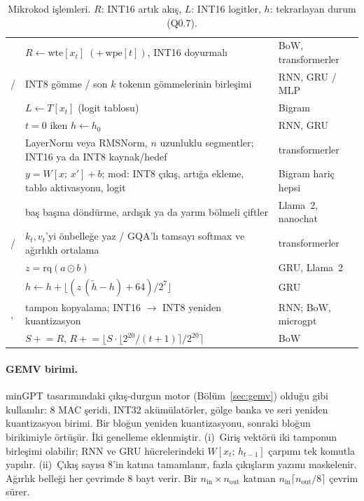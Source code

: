 \begin{table}[h]
  \centering\small
  \caption{Mikrokod işlemleri. $R$: INT16 artık akış, $L$: INT16 logitler, $h$: tekrarlayan durum (Q0.7).}
  \label{tab:isa}
  \setlength{\tabcolsep}{4pt}
  \begin{tabularx}{\textwidth}{@{}lLl@{}}
    \toprule
     &  &  \\ \midrule
     & $R \leftarrow \mathrm{wte}[x_t]\;(+\,\mathrm{wpe}[t])$, INT16 doyurmalı & BoW, transformerler \\
     /  & INT8 gömme / son $k$ tokenın gömmelerinin birleşimi & RNN, GRU / MLP \\
     & $L \leftarrow T[x_t]$ (logit tablosu) & Bigram \\
     & $t=0$ iken $h \leftarrow h_0$ & RNN, GRU \\
     & LayerNorm veya RMSNorm, $n$ uzunluklu segmentler; INT16 ya da INT8 kaynak/hedef & transformerler \\
     & $y = W[x;\,x'] + b$; mod: INT8 çıkış, artığa ekleme, tablo aktivasyonu, logit & Bigram hariç hepsi \\
     & baş başına döndürme, ardışık ya da yarım bölmeli çiftler & Llama~2, nanochat \\
     /  & $k_t, v_t$'yi önbelleğe yaz / GQA'lı tamsayı softmax ve ağırlıklı ortalama & transformerler \\
     & $z = \mathrm{rq}(a \odot b)$ & GRU, Llama~2 \\
     & $h \leftarrow h + \lfloor (z\,(\tilde h - h) + 64) / 2^7 \rfloor$ & GRU \\
    ,  & tampon kopyalama; INT16 $\to$ INT8 yeniden kuantizasyon & RNN; BoW, microgpt \\
     & $S \mathrel{+}= R$, \;$R \mathrel{+}= \lfloor S \cdot \lfloor 2^{20}/(t+1) \rceil / 2^{20} \rceil$ & BoW \\ \bottomrule
  \end{tabularx}
\end{table}

\paragraph{GEMV birimi.} minGPT tasarımındaki çıkış-durgun motor (Bölüm~\ref{sec:gemv}) olduğu gibi kullanılır: 8 MAC şeridi, INT32 akümülatörler, gölge banka ve seri yeniden kuantizasyon birimi. Bir bloğun yeniden kuantizasyonu, sonraki bloğun birikimiyle örtüşür. İki genelleme eklenmiştir. (i)~Giriş vektörü iki tamponun birleşimi olabilir; RNN ve GRU hücrelerindeki $W[x_t;\,h_{t-1}]$ çarpımı tek komutla yapılır. (ii)~Çıkış sayısı 8'in katına tamamlanır, fazla çıkışların yazımı maskelenir. Ağırlık belleği her çevrimde 8 bayt verir. Bir $n_\text{in}\times n_\text{out}$ katman $n_\text{in}\lceil n_\text{out}/8\rceil$ çevrim sürer.

